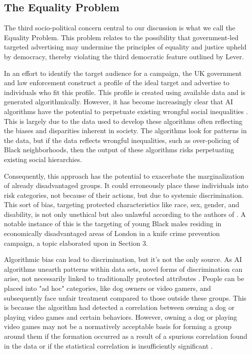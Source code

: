 \documentclass[preprint]{acmart}
\begin{document}
\subsection{The Equality Problem}

The third socio-political concern central to our discussion is what we call the Equality Problem. This problem relates to the possibility that government-led targeted advertising may undermine the principles of equality and justice upheld by democracy, thereby violating the third democratic feature outlined by Lever.

In an effort to identify the target audience for a campaign, the UK government and law enforcement construct a profile of the ideal target and advertise to individuals who fit this profile. This profile is created using available data and is generated algorithmically. However, it has become increasingly clear that AI algorithms have the potential to perpetuate existing wrongful social inequalities \cite{buolamwini2018gender,eubanks2018automating,obermeyer2019dissecting}. This is largely due to the data used to develop these algorithms often reflecting the biases and disparities inherent in society. The algorithms look for patterns in the data, but if the data reflects wrongful inequalities, such as over-policing of Black neighborhoods, then the output of these algorithms risks perpetuating existing social hierarchies.


Consequently, this approach has the potential to exacerbate the marginalization of already disadvantaged groups. It could erroneously place these individuals into risk categories, not because of their actions, but due to systemic discrimination. This sort of bias, targeting protected characteristics like race, sex, gender, and disability, is not only unethical but also unlawful according to the authors of \textit{\citeauthor{equalityact}}. A notable instance of this is the targeting of young Black males residing in economically disadvantaged areas of London in a knife crime prevention campaign, a topic elaborated upon in Section 3.

Algorithmic bias can lead to discrimination, but it's not the only source. As AI algorithms unearth patterns within data sets, novel forms of discrimination can arise, not necessarily linked to traditionally protected attributes \cite{wachter2021}. People can be placed into "ad hoc" categories, like dog owners or video gamers, and subsequently face unfair treatment compared to those outside these groups. This is because the algorithm had detected a correlation between owning a dog or playing video games and certain behaviors. However, owning a dog or playing video games may not be a normatively acceptable basis for forming a group around them if the formation occurred as a result of a spurious correlation found in the data or if the statistical correlation is insufficiently significant \cite{wachter2021}.
\end{document}
